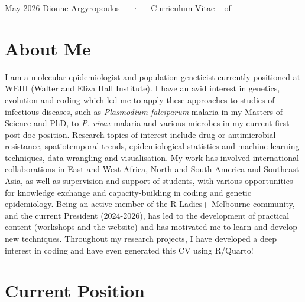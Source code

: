\documentclass[11pt,a4paper,]{awesome-cv}
\begin{document}
\makecvheader

\makecvfooter
  {May 2026}
    {Dionne Argyropoulos~~~·~~~Curriculum Vitae}
  {\thepage~ of \pageref{LastPage}~}





\section{About Me}\label{about-me}

\footnotesize

I am a molecular epidemiologist and population geneticist currently
positioned at WEHI (Walter and Eliza Hall Institute). I have an avid
interest in genetics, evolution and coding which led me to apply these
approaches to studies of infectious diseases, such as \emph{Plasmodium
falciparum} malaria in my Masters of Science and PhD, to \emph{P. vivax}
malaria and various microbes in my current first post-doc position.
Research topics of interest include drug or antimicrobial resistance,
spatiotemporal trends, epidemiological statistics and machine learning
techniques, data wrangling and visualisation. My work has involved
international collaborations in East and West Africa, North and South
America and Southeast Asia, as well as supervision and support of
students, with various opportunities for knowledge exchange and
capacity-building in coding and genetic epidemiology. Being an active
member of the R-Ladies+ Melbourne community, and the current President
(2024-2026), has led to the development of practical content (workshops
and the website) and has motivated me to learn and develop new
techniques. Throughout my research projects, I have developed a deep
interest in coding and have even generated this CV using R/Quarto!

\normalsize

\section{Current Position}\label{current-position}
\end{document}
